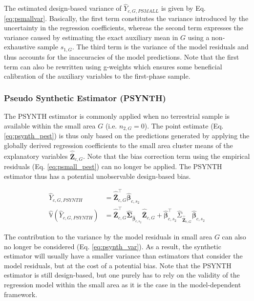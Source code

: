 \documentclass[remotesensing,article,submit,moreauthors,pdftex,10pt,a4paper]{mdpi}
\newcommand{\psynth}{PSYNTH}
\newcommand{\var}{\mathbb{V}}
\begin{document}
The estimated design-based variance of $ \hat{Y}_{c,G,PSMALL}$ is given by Eq. \ref{eq:psmallvar}. Basically, the first term constitutes the variance introduced by the uncertainty in the regression coefficients, whereas the second term expresses the variance caused by estimating the exact auxiliary mean in $G$ using a non-exhaustive sample $s_{1,G}$. The third term is the variance of the model residuals and thus accounts for the inaccuracies of the model predictions. Note that the first term can also be rewritten using g-weights \cite[pg.14]{mandallaz2016} which ensures some beneficial calibration of the auxiliary variables to the first-phase sample.\\


\subsubsection{Pseudo Synthetic Estimator (\psynth{})}
\label{sec:psynth}

The \psynth{} estimator is commonly applied when no terrestrial sample is available within the small area $G$ (i.e. $n_{2,G}=0$). The point estimate (Eq. \ref{eq:psynth_pest}) is thus only based on the predictions generated by applying the globally derived regression coefficients to the small area cluster means of the explanatory variables $\hat{\bar{\pmb{Z}}}_{c,G}$. Note that the bias correction term using the empirical residuals (Eq. \ref{eq:psmall_pest}) can no longer be applied. The \psynth{} estimator thus has a potential unobservable design-based bias.

\begin{subequations}\label{eq:psynth}
	\begin{align}
	\hat{Y}_{c,G,PSYNTH} & =\hat{\bar{\pmb{Z}}}_{c,G}^{\top}\hat{\pmb{\beta}}_{c,s_2} \label{eq:psynth_pest} \\
	\hat{\var}(\hat{Y}_{c,G,PSYNTH})& =
	\hat{\bar{\pmb{Z}}}_{c,G}^{\top}\hat{\pmb{\Sigma}}_{\hat{\pmb{\beta}}_{c,s_2}}
	\hat{\bar{\pmb{Z}}}_{c,G}
	+ \hat{\pmb{\beta}}^{\top}_{c,s_2}\hat{\Sigma}_{\hat{\bar{\pmb{Z}}}_{c,G}}\hat{\pmb{\beta}}_{c,s_2} \label{eq:psynth_var}
	\end{align}
\end{subequations}

The contribution to the variance by the model residuals in small area $G$ can also no longer be considered (Eq. \ref{eq:psynth_var}). As a result, the synthetic estimator will usually have a smaller variance than estimators that consider the model residuals, but at the cost of a potential bias. Note that the \psynth{} estimator is still design-based, but one purely has to rely on the validity of the regression model within the small area as it is the case in the model-dependent framework.\\
\end{document}
